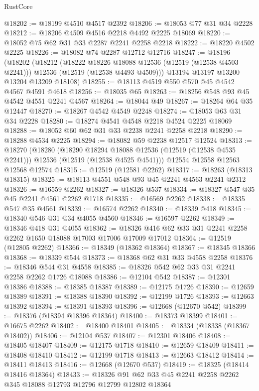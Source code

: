\begin{lexlean}{RustCore}
\begin{coremodule}
@18202 := @18199 @4510 @4517 @2392
@18206 := @18053 @77 @31 @34 @2228
@18212 := @18206 @4509 @4516 @2218 @4492 @2225 @18069
@18220 := @18052 @75 @62 @31 @33 @2287 @2241 @2258 @2218
@18222 := @18220 @4502 @2225
@18226 := @18082 @74 @2287 @12712 @12716
@18247 := @18196
    (@18202
      (@18212
        (@18222 @18226 @18088 @12536 (@12519 (@12538 @4503 @2241)))
        @12536
        (@12519 (@12538 @4493 @4509)))
      @13194
      @13197
      @13200
      @13204
      @13209
      @18108)
@18255 := @18113 @4519 @550 @570 @45 @4542 @4567 @4591 @4618
@18256 := @18035 @65
@18263 := @18256 @548 @93 @45 @4542 @4551 @2241 @4567
@18264 := @18044 @49
@18267 := @18264 @64 @35 @12447
@18270 := @18267 @4542 @4549 @2248
@18274 := @18053 @63 @31 @34 @2228
@18280 := @18274 @4541 @4548 @2218 @4524 @2225 @18069
@18288 := @18052 @60 @62 @31 @33 @2238 @2241 @2258 @2218
@18290 := @18288 @4534 @2225
@18294 := @18082 @59 @2238 @12517 @12524
@18313 := @18270
    (@18280
      (@18290 @18294 @18088 @12536 (@12519 (@12538 @4535 @2241)))
      @12536
      (@12519 (@12538 @4525 @4541)))
    @12554
    @12558
    @12563
    @12568
    @12574
@18315 := @12519 (@12581 @2262)
@18317 := @18263 (@18313 @18315)
@18325 := @18113 @4551 @548 @93 @45 @2241 @4563 @2241 @2312
@18326 := @16559 @2262
@18327 := @18326 @537
@18334 := @18327 @547 @35 @45 @2241 @4561 @2262 @1718
@18335 := @16569 @2262
@18338 := @18335 @547 @35 @4561
@18339 := @16574 @2262
@18340 := @18339 @418
@18345 := @18340 @546 @31 @34 @4055 @4560
@18346 := @16597 @2262
@18349 := @18346 @418 @31 @4055
@18362 := @18326 @416 @62 @33 @31 @2241 @2258 @2262 @1650 @18088 @17003 @17006 @17009 @17012
@18364 := @12519 (@12805 @2262)
@18366 := @18349 (@18362 @18364)
@18367 := @18345 @18366
@18368 := @18339 @544
@18373 := @18368 @62 @31 @33 @4558 @2258
@18376 := @18346 @544 @31 @4558
@18385 := @18326 @542 @62 @33 @31 @2241 @2258 @2262 @1726 @18088
@18386 := @12104 @542
@18387 := @12301 @18386
@18388 := @18385 @18387
@18389 := @12175 @1726
@18390 := @12659 @18389
@18391 := @18388 @18390
@18392 := @12199 @1726
@18393 := @12663 @18392
@18394 := @18391 @18393
@18396 := @12668 (@12670 @542)
@18399 := @18376 (@18394 @18396 @18364)
@18400 := @18373 @18399
@18401 := @16675 @2262
@18402 := @18400 @18401
@18405 := @18334 (@18338 (@18367 @18402))
@18406 := @12104 @537
@18407 := @12301 @18406
@18408 := @18405 @18407
@18409 := @12175 @1718
@18410 := @12659 @18409
@18411 := @18408 @18410
@18412 := @12199 @1718
@18413 := @12663 @18412
@18414 := @18411 @18413
@18416 := @12668 (@12670 @537)
@18419 := @18325 (@18414 @18416 @18364)
@18433 := @18326 @91 @62 @33 @45 @2241 @2258 @2262 @345 @18088 @12793 @12796 @12799 @12802 @18364

\end{coremodule}
\end{lexlean}
